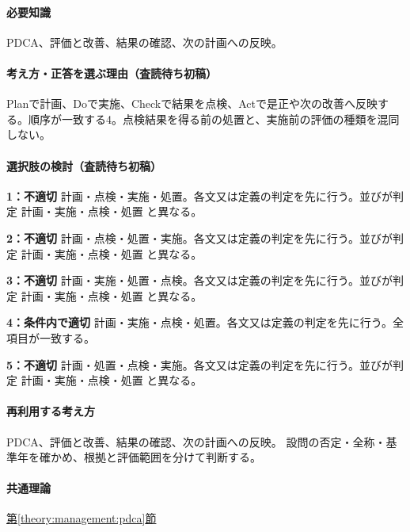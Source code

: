 \paragraph{必要知識} PDCA、評価と改善、結果の確認、次の計画への反映。

\paragraph{考え方・正答を選ぶ理由（査読待ち初稿）} Planで計画、Doで実施、Checkで結果を点検、Actで是正や次の改善へ反映する。順序が一致する4。点検結果を得る前の処置と、実施前の評価の種類を混同しない。

\paragraph{選択肢の検討（査読待ち初稿）}\mbox{}\par

\noindent\textbf{1：不適切} 計画・点検・実施・処置。各文又は定義の判定を先に行う。並びが判定 計画・実施・点検・処置 と異なる。\par

\noindent\textbf{2：不適切} 計画・点検・処置・実施。各文又は定義の判定を先に行う。並びが判定 計画・実施・点検・処置 と異なる。\par

\noindent\textbf{3：不適切} 計画・実施・処置・点検。各文又は定義の判定を先に行う。並びが判定 計画・実施・点検・処置 と異なる。\par

\noindent\textbf{4：条件内で適切} 計画・実施・点検・処置。各文又は定義の判定を先に行う。全項目が一致する。\par

\noindent\textbf{5：不適切} 計画・処置・点検・実施。各文又は定義の判定を先に行う。並びが判定 計画・実施・点検・処置 と異なる。\par

\paragraph{再利用する考え方} PDCA、評価と改善、結果の確認、次の計画への反映。 設問の否定・全称・基準年を確かめ、根拠と評価範囲を分けて判断する。

\paragraph{共通理論} \hyperref[theory:management:pdca]{第\ref*{theory:management:pdca}節}

